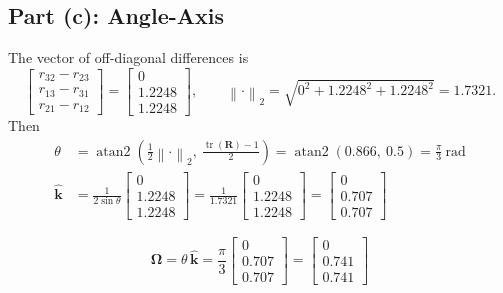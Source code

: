 \documentclass[11pt]{article}
\newcommand{\R}{\bm{R}}
\newcommand{\khat}{\widehat{\bm{k}}}
\newcommand{\Omvec}{\bm{\Omega}}
\newcommand{\atantwo}{\operatorname{atan2}}
\begin{document}
\subsection*{Part (c): Angle-Axis}
The vector of off-diagonal differences is
\[
    \begin{bmatrix} r_{32} - r_{23}\\ r_{13} - r_{31}\\ r_{21} - r_{12} \end{bmatrix}
    = \begin{bmatrix} 0\\ 1.2248\\ 1.2248 \end{bmatrix},
    \qquad
    \left\lVert\cdot\right\rVert_2 = \sqrt{0^2 + 1.2248^2 + 1.2248^2} = 1.7321.
\]
Then
\begin{align*}
    \theta &= \atantwo\!\left(\tfrac{1}{2}\left\lVert\cdot\right\rVert_2,\ \frac{\operatorname{tr}(\R) - 1}{2}\right)
            = \atantwo(0.866,\ 0.5) = \frac{\pi}{3}\ \text{rad}\\[2pt]
    \khat &= \frac{1}{2\sin\theta}\begin{bmatrix} 0\\ 1.2248\\ 1.2248 \end{bmatrix}
            = \frac{1}{1.7321}\begin{bmatrix} 0\\ 1.2248\\ 1.2248 \end{bmatrix}
            = \begin{bmatrix} 0\\ 0.707\\ 0.707 \end{bmatrix}
\end{align*}
\begin{result}
\[
    \Omvec = \theta\,\khat = \frac{\pi}{3}\begin{bmatrix} 0\\ 0.707\\ 0.707 \end{bmatrix}
    = \begin{bmatrix} 0\\ 0.741\\ 0.741 \end{bmatrix}
\]
\end{result}
\end{document}
